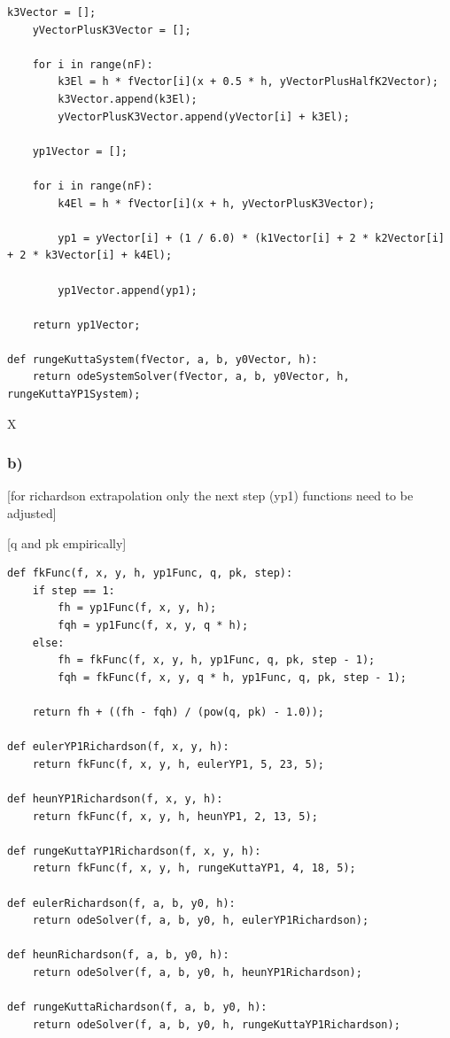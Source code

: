 \begin{lstlisting}[caption=todo]
	k3Vector = [];
	yVectorPlusK3Vector = [];
	
	for i in range(nF):
		k3El = h * fVector[i](x + 0.5 * h, yVectorPlusHalfK2Vector);
		k3Vector.append(k3El);
		yVectorPlusK3Vector.append(yVector[i] + k3El);
	
	yp1Vector = [];
	
	for i in range(nF):
		k4El = h * fVector[i](x + h, yVectorPlusK3Vector);
		
		yp1 = yVector[i] + (1 / 6.0) * (k1Vector[i] + 2 * k2Vector[i] + 2 * k3Vector[i] + k4El);
		
		yp1Vector.append(yp1);
	
	return yp1Vector;

def rungeKuttaSystem(fVector, a, b, y0Vector, h):
	return odeSystemSolver(fVector, a, b, y0Vector, h, rungeKuttaYP1System);
\end{lstlisting}



X



\subsubsection{b)}

[for richardson extrapolation only the next step (yp1) functions need to be adjusted]

[q and pk empirically]

\begin{lstlisting}[caption=todo]
def fkFunc(f, x, y, h, yp1Func, q, pk, step):
	if step == 1:
		fh = yp1Func(f, x, y, h);
		fqh = yp1Func(f, x, y, q * h);
	else:
		fh = fkFunc(f, x, y, h, yp1Func, q, pk, step - 1);
		fqh = fkFunc(f, x, y, q * h, yp1Func, q, pk, step - 1);
	
	return fh + ((fh - fqh) / (pow(q, pk) - 1.0));

def eulerYP1Richardson(f, x, y, h):
	return fkFunc(f, x, y, h, eulerYP1, 5, 23, 5);

def heunYP1Richardson(f, x, y, h):
	return fkFunc(f, x, y, h, heunYP1, 2, 13, 5);

def rungeKuttaYP1Richardson(f, x, y, h):
	return fkFunc(f, x, y, h, rungeKuttaYP1, 4, 18, 5);

def eulerRichardson(f, a, b, y0, h):
	return odeSolver(f, a, b, y0, h, eulerYP1Richardson);

def heunRichardson(f, a, b, y0, h):
	return odeSolver(f, a, b, y0, h, heunYP1Richardson);

def rungeKuttaRichardson(f, a, b, y0, h):
	return odeSolver(f, a, b, y0, h, rungeKuttaYP1Richardson);
\end{lstlisting}



